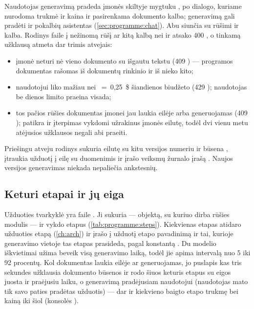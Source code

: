 Naudotojas generavimą pradeda įmonės skiltyje  mygtuku , po
dialogo, kuriame nurodoma trukmė ir kaina ir pasirenkama dokumento kalba; generavimą gali
pradėti ir pokalbių asistentas (\cref{sec:programme:chat}). Abu siunčia
 su rūšimi ir kalba. Rodinys
 faile  į nežinomą rūšį ar kitą kalbą nei
 ir  atsako 400 , o tinkamą užklausą atmeta dar trimis
atvejais:

\begin{itemize}
  \item įmonė neturi nė vieno dokumento su išgautu tekstu (409 ) ---
        programos dokumentas rašomas iš dokumentų rinkinio ir iš nieko kito;
  \item naudotojui liko mažiau nei ~=~0,25~\$ šiandienos
        biudžeto (429 ); naudotojas be dienos limito praeina visada;
  \item tos pačios rūšies dokumentas įmonei jau laukia eilėje arba generuojamas (409
        ); patikra ir įterpimas vykdomi užrakinus įmonės eilutę, todėl
        dvi vienu metu atėjusios užklausos negali abi praeiti.
\end{itemize}

Priešingu atveju rodinys sukuria eilutę su kitu versijos numeriu ir būsena ,
įtraukia užduotį į eilę su duomenimis  ir įrašo veiksmų žurnalo įrašą
. Naujos versijos generavimas niekada nepaliečia ankstesnių.

\subsection{Keturi etapai ir jų eiga}

Užduoties tvarkyklė yra  faile . Ji sukuria 
--- objektą, su kuriuo dirba rūšies modulis --- ir vykdo etapus (\cref{tab:programme:steps}).
Kiekvienas etapas atidaro užduoties etapą (\cref{ch:arch}) ir įrašo į užduotį etapo
pavadinimą ir tai, kurioje generavimo vietoje tas etapas prasideda, pagal konstantą
. Du modelio iškvietimai užima beveik visą generavimo laiką,
todėl jie apima intervalą nuo 5 iki 92 procentų. Kol dokumentas laukia eilėje ar generuojamas,
jo puslapis kas tris sekundes užklausia dokumento būsenos ir rodo šiuos keturis etapus su
eigos juosta ir praėjusiu laiku, o generavimą pradėjusiam naudotojui (naudotojas mato tik savo
paties pradėtas užduotis) --- dar ir kiekvieno baigto etapo trukmę bei kainą iki šiol (konsolės
).

